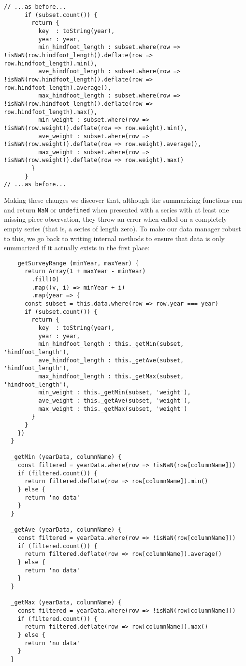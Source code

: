 \begin{verbatim}
// ...as before...
      if (subset.count()) {
        return {
          key  : toString(year),
          year : year,
          min_hindfoot_length : subset.where(row => !isNaN(row.hindfoot_length)).deflate(row => row.hindfoot_length).min(),
          ave_hindfoot_length : subset.where(row => !isNaN(row.hindfoot_length)).deflate(row => row.hindfoot_length).average(),
          max_hindfoot_length : subset.where(row => !isNaN(row.hindfoot_length)).deflate(row => row.hindfoot_length).max(),
          min_weight : subset.where(row => !isNaN(row.weight)).deflate(row => row.weight).min(),
          ave_weight : subset.where(row => !isNaN(row.weight)).deflate(row => row.weight).average(),
          max_weight : subset.where(row => !isNaN(row.weight)).deflate(row => row.weight).max()
        }
      }
// ...as before...
\end{verbatim}

Making these changes we discover that,
although the summarizing functions run and return
\texttt{NaN} or \texttt{undefined}
when presented with a series with at least one missing piece observation,
they throw an error when called on a completely empty series
(that is, a series of length zero).
To make our data manager robust to this,
we go back to writing internal methods
to ensure that data is only summarized
if it actually exists in the first place:

\begin{verbatim}
    getSurveyRange (minYear, maxYear) {
      return Array(1 + maxYear - minYear)
        .fill(0)
        .map((v, i) => minYear + i)
        .map(year => {
      const subset = this.data.where(row => row.year === year)
      if (subset.count()) {
        return {
          key  : toString(year),
          year : year,
          min_hindfoot_length : this._getMin(subset, 'hindfoot_length'),
          ave_hindfoot_length : this._getAve(subset, 'hindfoot_length'),
          max_hindfoot_length : this._getMax(subset, 'hindfoot_length'),
          min_weight : this._getMin(subset, 'weight'),
          ave_weight : this._getAve(subset, 'weight'),
          max_weight : this._getMax(subset, 'weight')
        }
      }
    })
  }

  _getMin (yearData, columnName) {
    const filtered = yearData.where(row => !isNaN(row[columnName]))
    if (filtered.count()) {
      return filtered.deflate(row => row[columnName]).min()
    } else {
      return 'no data'
    }
  }

  _getAve (yearData, columnName) {
    const filtered = yearData.where(row => !isNaN(row[columnName]))
    if (filtered.count()) {
      return filtered.deflate(row => row[columnName]).average()
    } else {
      return 'no data'
    }
  }

  _getMax (yearData, columnName) {
    const filtered = yearData.where(row => !isNaN(row[columnName]))
    if (filtered.count()) {
      return filtered.deflate(row => row[columnName]).max()
    } else {
      return 'no data'
    }
  }
\end{verbatim}

